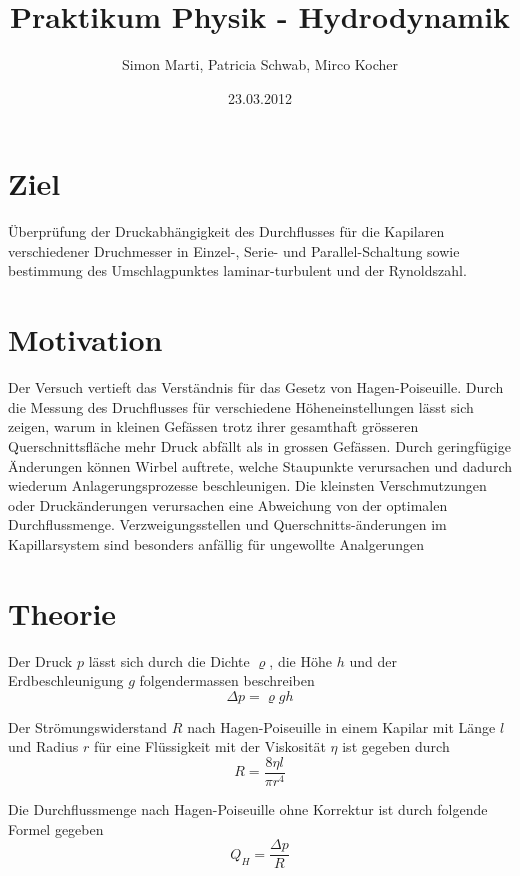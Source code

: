 \documentclass[12pt,a4paper]{article}
\title{Praktikum Physik - Hydrodynamik}
\author{Simon Marti, Patricia Schwab, Mirco Kocher}
\date{23.03.2012}
\begin{document}
\maketitle


\section*{Ziel}
\"Uberpr\"ufung der Druckabh\"angigkeit des Durchflusses f\"ur die Kapilaren verschiedener Druchmesser in Einzel-, Serie- und Parallel-Schaltung sowie bestimmung des Umschlagpunktes laminar-turbulent und der Rynoldszahl.

\section*{Motivation}
Der Versuch vertieft das Verst\"andnis f\"ur das Gesetz von Hagen-Poiseuille. Durch die Messung des Druchflusses f\"ur verschiedene H\"oheneinstellungen l\"asst sich zeigen, warum in kleinen Gef\"assen trotz ihrer gesamthaft gr\"osseren Querschnittsfl\"ache mehr Druck abf\"allt als in grossen Gef\"assen. Durch geringf\"ugige \"Anderungen k\"onnen Wirbel auftrete, welche Staupunkte verursachen und dadurch wiederum Anlagerungsprozesse beschleunigen. Die kleinsten Verschmutzungen oder Druck\"anderungen verursachen eine Abweichung von der optimalen Durchflussmenge. Verzweigungsstellen und Querschnitts-\"anderungen im Kapillarsystem sind besonders anf\"allig f\"ur ungewollte Analgerungen

\section*{Theorie}
Der Druck $p$ l\"asst sich durch die Dichte $\varrho$, die H\"ohe $h$ und der Erdbeschleunigung $g$ folgendermassen beschreiben
\begin{equation}
\Delta p = \varrho g h
\end{equation}

Der Str\"omungswiderstand $R$ nach Hagen-Poiseuille in einem Kapilar mit L\"ange $l$ und Radius $r$ f\"ur eine Fl\"ussigkeit mit der Viskosit\"at $\eta$ ist gegeben durch
\begin{equation}
R = \frac{8\eta l}{\pi r^4}
\end{equation}

Die Durchflussmenge nach Hagen-Poiseuille ohne Korrektur ist durch folgende Formel gegeben
\begin{equation}
Q_H = \frac{\Delta p}{R}
\end{equation}
\end{document}
